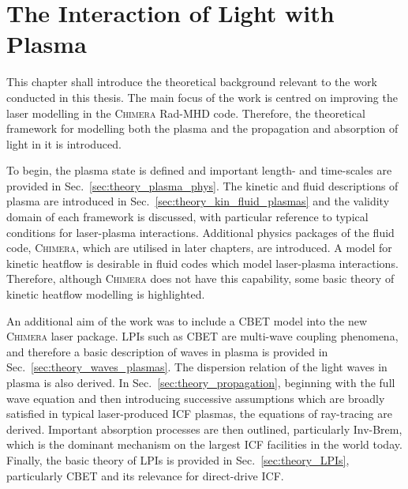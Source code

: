 \chapter{The Interaction of Light with Plasma}%
\label{chap:Theory}
\acresetall

This chapter shall introduce the theoretical background relevant to the work conducted in this thesis.
The main focus of the work is centred on improving the laser modelling in the \textsc{Chimera} \ac{Rad-MHD} code.
Therefore, the theoretical framework for modelling both the plasma and the propagation and absorption of light in it is introduced.

To begin, the plasma state is defined and important length- and time-scales are provided in Sec.~\ref{sec:theory_plasma_phys}.
The kinetic and fluid descriptions of plasma are introduced in Sec.~\ref{sec:theory_kin_fluid_plasmas} and the validity domain of each framework is discussed, with particular reference to typical conditions for laser-plasma interactions.
Additional physics packages of the fluid code, \textsc{Chimera}, which are utilised in later chapters, are introduced.
A model for kinetic heatflow is desirable in fluid codes which model laser-plasma interactions.
Therefore, although \textsc{Chimera} does not have this capability, some basic theory of kinetic heatflow modelling is highlighted.

An additional aim of the work was to include a \ac{CBET} model into the new \textsc{Chimera} laser package.
\ac{LPIs} such as \ac{CBET} are multi-wave coupling phenomena, and therefore a basic description of waves in plasma is provided in Sec.~\ref{sec:theory_waves_plasmas}.
The dispersion relation of the light waves in plasma is also derived.
In Sec.~\ref{sec:theory_propagation}, beginning with the full wave equation and then introducing successive assumptions which are broadly satisfied in typical laser-produced \ac{ICF} plasmas, the equations of ray-tracing are derived.
Important absorption processes are then outlined, particularly \ac{Inv-Brem}, which is the dominant mechanism on the largest \ac{ICF} facilities in the world today.
Finally, the basic theory of \ac{LPIs} is provided in Sec.~\ref{sec:theory_LPIs}, particularly \ac{CBET} and its relevance for direct-drive \ac{ICF}.

\newpage


